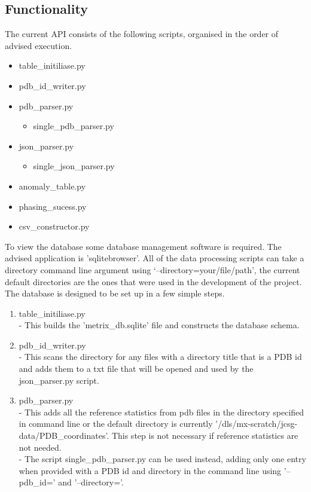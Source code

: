\documentclass[11pt, a4paper]{article}
\begin{document}
\begin{multicols}{2}
\section{Functionality}
The current API consists of the following scripts, organised in the order of advised execution.
\begin{itemize}
\item table\_initiliase.py
\item pdb\_id\_writer.py
\item pdb\_parser.py
\begin{itemize}
\item single\_pdb\_parser.py
\end{itemize}
\item json\_parser.py
\begin{itemize}
\item single\_json\_parser.py
\end{itemize}
\item anomaly\_table.py
\item phasing\_sucess.py
\item csv\_constructor.py
\end{itemize}
To view the database some database management software is required. The advised application is 'sqlitebrowser'. All of the data processing scripts can take a directory command line argument using `--directory=your/file/path', the current default directories are the ones that were used in the development of the project. The database is designed to be set up in a few simple steps.
\begin{enumerate}
\item table\_initiliase.py\\
- This builds the 'metrix\_db.sqlite' file and constructs the database schema.
\item pdb\_id\_writer.py\\
- This scans the directory for any files with a directory title that is a PDB id and adds them to a txt file that will be opened and used by the json\_parser.py script. 
\item pdb\_parser.py\\
- This adds all the reference statistics from pdb files in the directory specified in command line or the default directory is currently '/dls/mx-scratch/jcsg-data/PDB\_coordinates'. This step is not necessary if reference statistics are not needed.\\
- The script single\_pdb\_parser.py can be used instead, adding only one entry when provided with a PDB id and directory in the command line using '--pdb\_id=' and '--directory='. 


\end{enumerate}
\end{multicols}
\end{document}
